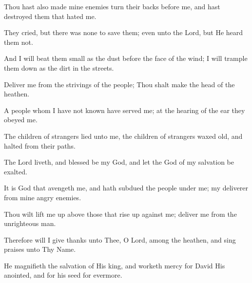 Thou hast also made mine enemies turn their backs before me, and hast destroyed them that hated me.

They cried, but there was none to save them; even unto the Lord, but He heard them not.

And I will beat them small as the dust before the face of the wind; I will trample them down as the dirt in the streets.

Deliver me from the strivings of the people; Thou shalt make the head of the heathen.

A people whom I have not known have served me; at the hearing of the ear they obeyed me.

The children of strangers lied unto me, the children of strangers waxed old, and halted from their paths.

The Lord liveth, and blessed be my God, and let the God of my salvation be exalted.

It is God that avengeth me, and hath subdued the people under me; my deliverer from mine angry enemies.

Thou wilt lift me up above those that rise up against me; deliver me from the unrighteous man.

Therefore will I give thanks unto Thee, O Lord, among the heathen, and sing praises unto Thy Name.

He magnifieth the salvation of His king, and worketh mercy for David His anointed, and for his seed for evermore.
